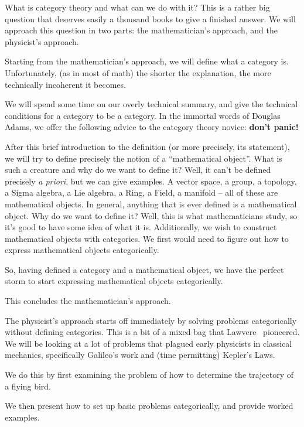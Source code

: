 What is category theory and what can we do with it? This is a
rather big question that deserves easily a thousand books to give
a finished answer. We will approach this question in two parts:
the mathematician's approach, and the physicist's approach.

Starting from the mathematician's approach, we will define what a
category is. Unfortunately, (as in most of math) the shorter the
explanation, the more technically incoherent it becomes. 

We will spend some time on our overly technical summary, and give
the technical conditions for a category to be a category. 
In the immortal words of Douglas Adams, we offer the following advice
to the category theory novice: \textbf{don't panic!}

After this brief introduction to the definition (or more
precisely, its statement), we will try to define precisely the
notion of a ``mathematical object''. What is such a creature and
why do we want to define it? Well, it can't
be defined precisely \emph{a priori}, but we can give examples. A
vector space, a group, a topology, a Sigma algebra, a Lie
algebra, a Ring, a Field, a manifold -- all of these are
mathematical objects. In general, anything that is ever defined
is a mathematical object. Why do we want to define it? Well, this
is what mathematicians study, so it's good to have some idea of
what it is. Additionally, we wish to construct mathematical
objects with categories. We first would need to figure out how to
express mathematical objects categorically.

So, having defined a category and a mathematical object, we have
the perfect storm to start expressing mathematical objects
categorically. 

This concludes the mathematician's approach.

The physicist's approach starts off immediately by solving
problems categorically without defining categories. This is a bit
of a mixed bag that Lawvere~\cite{lawvere1997cmf} pioneered. We
will be looking at a lot of problems that plagued early
physicists in classical mechanics, specifically Galileo's work
and (time permitting) Kepler's Laws.

We do this by first examining the problem of how to determine the
trajectory of a flying bird.

We then present how to set up basic problems categorically, and
provide worked examples.
